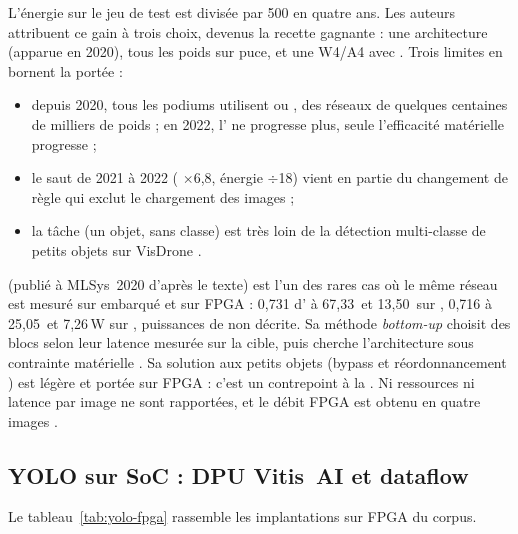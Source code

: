 L'énergie sur le jeu de test est divisée par 500 en quatre ans. Les auteurs attribuent ce
gain à trois choix, devenus la recette gagnante : une architecture  (apparue en
2020), tous les poids sur puce, et une  W4/A4 avec 
. Trois limites en bornent la portée :
\begin{itemize}
  \item depuis 2020, tous les podiums utilisent  ou , des réseaux de
    quelques centaines de milliers de poids ; en 2022, l' ne progresse plus, seule
    l'efficacité matérielle progresse  ;
  \item le saut de 2021 à 2022 ( $\times$6,8, énergie $\div$18) vient en partie du
    changement de règle qui exclut le chargement des images  ;
  \item la tâche (un objet, sans classe) est très loin de la détection multi-classe de
    petits objets sur VisDrone \deduit.
\end{itemize}

 \citep{arxiv-1909.09709-skynet-hardware-efficient-method-object}\pp{} (publié à
MLSys~2020 d'après le texte) est l'un des rares cas où le même réseau est mesuré sur 
embarqué et sur FPGA : 0,731 d' à 67,33\, et 13,50\, sur , 0,716 à 25,05\,
et 7,26\,W sur  , puissances de  non décrite. Sa méthode
\emph{bottom-up} choisit des blocs selon leur latence mesurée sur la cible, puis cherche
l'architecture sous contrainte matérielle . Sa solution aux petits objets
(bypass et réordonnancement ) est légère et portée sur FPGA : c'est un
contrepoint à la  \deduit. Ni ressources ni latence par image ne sont rapportées,
et le débit FPGA est obtenu en  quatre images .

\subsection{YOLO sur SoC : DPU Vitis~AI et dataflow}

Le tableau~\ref{tab:yolo-fpga} rassemble les implantations  sur FPGA du corpus.

